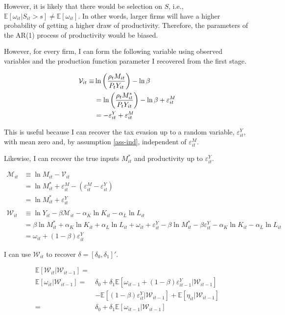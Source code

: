 \documentclass[
  12pt]{article}
\theoremstyle{definition}
\theoremstyle{remark}
\begin{document}
However, it is likely that there would be selection on \(S\), i.e.,
\(\mathbb{E}[\omega_{it}|S_{it}>s]\not=\mathbb{E}[\omega_{it}]\). In
other words, larger firms will have a higher probability of getting a
higher draw of productivity. Therefore, the parameters of the AR(1)
process of productivity would be biased.

However, for every firm, I can form the following variable using
observed variables and the production function parameter I recovered
from the first stage.

\[
\begin{aligned}
    \mathcal V_{it}\equiv&\ln\left(\frac{\rho_t M_{it}}{P_{t}Y_{it}}\right)-\ln\beta \notag \\
    &=\ln\left(\frac{\rho_tM^*_{it}}{P_{t}Y_{it}}\right)-\ln\beta+\varepsilon^M_{it} \notag \\
    &=-\varepsilon^Y_{it} +\varepsilon^M_{it}
\end{aligned}
\]

This is useful because I can recover the tax evasion up to a random
variable, \(\varepsilon^Y_{it}\), with mean zero and, by assumption
\ref{ass-ind}, independent of \(\varepsilon^M_{it}\).

Likewise, I can recover the true inputs \(M^*_{it}\) and productivity up
to \(\varepsilon^Y_{it}\).

\[
\begin{aligned}
    \mathcal M_{it}&\equiv \ln M_{it}-\mathcal V_{it}\\
    & = \ln M^*_{it} +\varepsilon^M_{it}-(\varepsilon^M_{it}- \varepsilon^Y_{it}) \\
    & = \ln M^*_{it} + \varepsilon^Y_{it} \\
    \\
    \mathcal W_{it} & \equiv \ln Y_{it} - \beta\mathcal M_{it}-\alpha_K \ln K_{it}-\alpha_L \ln L_{it}\\
    & = \beta\ln M^*_{it}+\alpha_K \ln K_{it}+\alpha_L \ln L_{it}+\omega_{it}+\varepsilon^Y_{it}-\beta\ln M^*_{it}-\beta\varepsilon^Y_{it}-\alpha_K \ln K_{it}-\alpha_L \ln L_{it} \\
    & = \omega_{it}+(1-\beta)\varepsilon^Y_{it}
\end{aligned}
\]

I can use \(\mathcal W_{it}\) to recover
\(\delta=[\delta_0,\delta_1]'\).

\[
\begin{aligned}
  \mathbb{E}[\mathcal W_{it}|\mathcal W_{it-1}]=&\\
  \mathbb{E}[\omega_{it}|\mathcal W_{it-1}]=&\delta_0+\delta_1\mathbb{E}[\omega_{it-1}+(1-\beta)\varepsilon^Y_{it-1}|\mathcal W_{it-1}]\\
  &-\mathbb{E}[(1-\beta)\varepsilon^Y_{it}|\mathcal W_{it-1}]
  +\mathbb{E}[\eta_{it}|\mathcal W_{it-1}]\\
  =&\delta_0+\delta_1\mathbb{E}[\omega_{it-1}|\mathcal W_{it-1}]
\end{aligned}
\]
\end{document}
